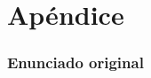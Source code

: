 \documentclass[a4paper,11pt]{article}
\begin{document}
%
%
%
%
%
%
%
%
%

\newpage

\part{Apéndice}
\appendix

\section{Enunciado original}\label{sec:enunciado}


\clearpage
\end{document}
